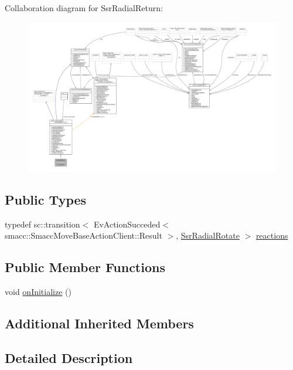 Collaboration diagram for Ssr\+Radial\+Return\+:
\nopagebreak
\begin{figure}[H]
\begin{center}
\leavevmode
\includegraphics[width=350pt]{structSsrRadialReturn__coll__graph}
\end{center}
\end{figure}
\subsection*{Public Types}
\begin{DoxyCompactItemize}
\item 
typedef sc\+::transition$<$ Ev\+Action\+Succeded$<$ smacc\+::\+Smacc\+Move\+Base\+Action\+Client\+::\+Result $>$, \hyperlink{structSsrRadialRotate}{Ssr\+Radial\+Rotate} $>$ \hyperlink{structSsrRadialReturn_aff2288b31f7e93b319ce7a50826f14f7}{reactions}
\end{DoxyCompactItemize}
\subsection*{Public Member Functions}
\begin{DoxyCompactItemize}
\item 
void \hyperlink{structSsrRadialReturn_a713e3a0722102ad2c4b030aeceefe823}{on\+Initialize} ()
\end{DoxyCompactItemize}
\subsection*{Additional Inherited Members}


\subsection{Detailed Description}


